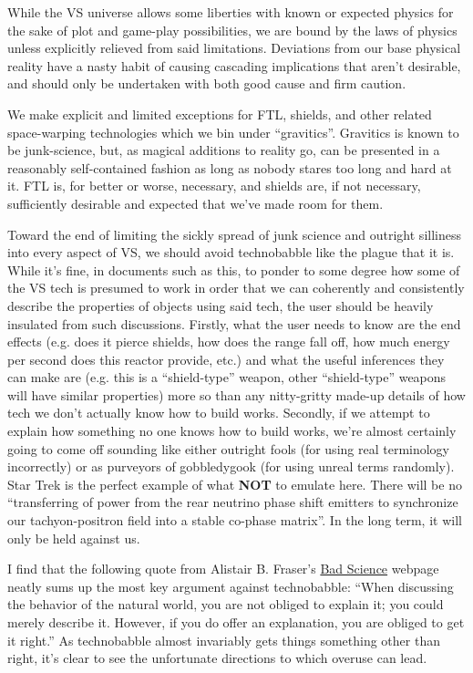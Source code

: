 \begin{itemize}
While the VS universe allows some liberties with known or
expected physics for the sake of plot and game-play possibilities, we
are bound by the laws of physics unless explicitly relieved from said
limitations. Deviations from our base physical reality have a nasty
habit of causing cascading implications that aren't desirable, and
should only be undertaken with both good cause and firm caution. 

We make explicit and limited exceptions for FTL, shields, and other
related space-warping technologies which we bin under
``gravitics''. Gravitics is known to be junk-science, but, as magical
additions to reality go, can be presented in a reasonably
self-contained fashion as long as nobody stares too long and hard at
it. FTL is, for better or worse, necessary, and shields are, if not
necessary, sufficiently desirable and expected that we've made room
for them.

Toward the end of limiting the sickly spread of junk science and
outright silliness into every aspect of VS, we should avoid
technobabble like the plague that it is. While it's fine, in documents
such as this, to ponder to some degree how some of the VS tech is
presumed to work in order that we can coherently and consistently
describe the properties of objects using said tech, the user should be
heavily insulated from such discussions. Firstly, what the user needs
to know are the end effects (e.g. does it pierce shields, how does the
range fall off, how much energy per second does this reactor provide,
etc.) and what the useful inferences they can make are (e.g. this is
a ``shield-type'' weapon, other ``shield-type'' weapons will have
similar properties) more so than any nitty-gritty made-up details of
how tech we don't actually know how to build works. Secondly, if we
attempt to explain how something no one knows how to build works,
we're almost certainly going to come off sounding like either outright
fools (for using real terminology incorrectly) or as purveyors of
gobbledygook (for using unreal terms randomly). Star Trek is the
perfect example of what {\bf NOT} to emulate here. There will be no
``transferring of power from the rear neutrino phase shift emitters
to synchronize our tachyon-positron field into a stable
co-phase matrix''. In the long term, it will only be held against us.

I find that the following quote from Alistair B. Fraser's
\href{http://www.ems.psu.edu/~fraser/BadScience.html}{Bad Science}
webpage neatly sums up the most key argument against
technobabble: ``When discussing the behavior of the natural world, you
are not obliged to explain it; you could merely describe it. However,
if you do offer an explanation, you are obliged to get it right.'' As
technobabble almost invariably gets things something other than right,
it's clear to see the unfortunate directions to which overuse can lead.


\end{itemize}

